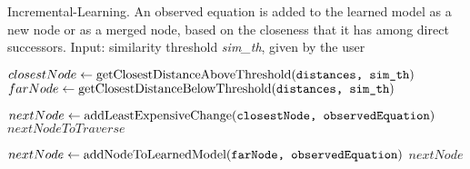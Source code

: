 \begin{algorithm}
	\caption{Incremental-Learning. An observed equation is added to the learned model as a new node or as a merged node, based on the closeness that it has among direct successors.
	\newline Input: similarity threshold \textit{sim\_th}, given by the user}
	\label{incrementalLearning}
	\begin{algorithmic}[1]
		
		\State $closestNode \gets \textrm{getClosestDistanceAboveThreshold(\texttt{distances, sim\_th})}$
		\State $farNode \gets \textrm{getClosestDistanceBelowThreshold(\texttt{distances, sim\_th})}$
		
			\State $nextNode \gets \textrm{addLeastExpensiveChange(\texttt{closestNode, observedEquation})}$
			\State	\Return $nextNodeToTraverse$
		\EndIf
		
			\State $nextNode \gets \textrm{addNodeToLearnedModel(\texttt{farNode, observedEquation})}$
			\State	\Return $nextNode$
		\EndIf
	
		\EndProcedure
	\end{algorithmic}
\end{algorithm}


